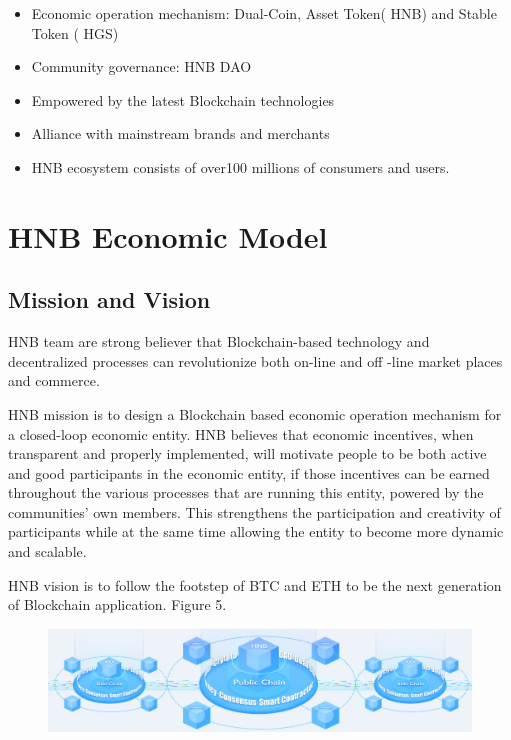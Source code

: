 \documentclass[fleqn,10pt]{SelfArx} %
\begin{document}
\begin{itemize}
\item{Economic operation mechanism: Dual-Coin, Asset Token( HNB) and Stable Token ( HGS)}       \item{Community governance: HNB DAO}
\item{Empowered by the latest Blockchain technologies}
\item{Alliance with mainstream brands and merchants}
\item{HNB ecosystem consists of over100 millions of consumers and users.}\\
\end{itemize}



\section{HNB Economic Model}

\subsection{Mission and Vision}


HNB team are strong believer that Blockchain-based technology and decentralized processes can revolutionize both on-line and off -line market places and commerce. 

HNB mission is to design a Blockchain based economic operation mechanism for a closed-loop economic entity. HNB believes that economic incentives, when transparent and properly implemented, will motivate people to be both active and good participants in the economic entity, if those incentives can be earned throughout the various processes that are running this entity, powered by the communities’ own members. This strengthens the participation and creativity of participants while at the same time allowing the entity to become more dynamic and scalable. 

HNB vision is to follow the footstep of BTC and ETH to be the next generation of Blockchain application. Figure 5.
\begin{figure}[ht]\centering %
\includegraphics[width=\linewidth]{5}
\caption{}
\label{fig:5}
\end{figure}
\end{document}

